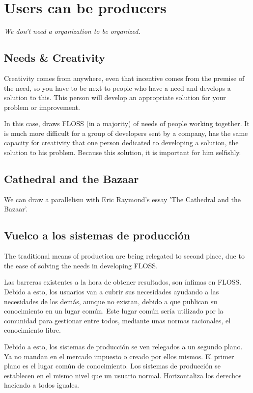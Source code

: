 \documentclass[11pt]{scrartcl}
\begin{document}
\section{Users can be producers}

\emph{We don't need a organization to be organized.}

\subsection{Needs \& Creativity}

Creativity comes from anywhere, even that incentive comes from the premise of the need, so you have to be next to people who have a need and develops a solution to this. This person will develop an appropriate solution for your problem or improvement.

In this case, draws FLOSS (in a majority) of needs of people working together. It is much more difficult for a group of developers sent by a company, has the same capacity for creativity that one person dedicated to developing a solution, the solution to his problem. Because this solution, it is important for him selfishly.

\subsection{Cathedral and the Bazaar}
\label{sub:cat-baz}

We can draw a parallelism with Eric Raymond's essay 'The Cathedral and the Bazaar'.

\subsection{Vuelco a los sistemas de producción}
\label{sub:turnover-production}

\par The traditional means of production are being relegated to second place, due to the ease of solving the needs in developing FLOSS.

Las barreras existentes a la hora de obtener resultados, son ínfimas en FLOSS. Debido a esto, los usuarios van a cubrir sus necesidades ayudando a las necesidades de los demás, aunque no existan, debido a que publican su conocimiento en un lugar común. Este lugar común sería utilizado por la comunidad para gestionar entre todos, mediante unas normas racionales, el conocimiento libre. 

Debido a esto, los sistemas de producción se ven relegados a un segundo plano. Ya no mandan en el mercado impuesto o creado por ellos mismos. El primer plano es el lugar común de conocimiento. Los sistemas de producción se establecen en el mismo nivel que un usuario normal. Horizontaliza los derechos haciendo a todos iguales. 
\end{document}
